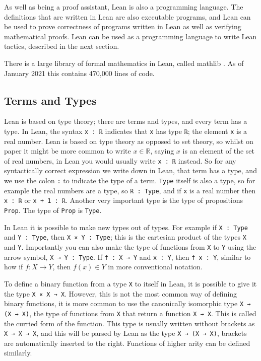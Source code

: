 \documentclass[12pt]{article} %
\theoremstyle{definition}
\theoremstyle{definition}
\theoremstyle{definition}
\theoremstyle{definition}
\begin{document}
As well as being a proof assistant, Lean is also a programming language. The definitions
that are written in Lean are also executable programs, and Lean can be used to prove correctness
of programs written in Lean as well as verifying mathematical proofs. Lean can
be used as a programming language to write Lean tactics, described in the next section.

There is a large library of formal mathematics in Lean, called mathlib
\cite{ThemathlibCommunity2020}. As of January 2021 this contains 470,000 lines of code.

\subsection{Terms and Types}

Lean is based on type theory; there are terms and types, and every term has a type.
In Lean, the syntax \lstinline{x : ℝ} indicates that \lstinline{x} has type \lstinline{ℝ};
the element \lstinline{x} is a real number.
Lean is based on type theory as opposed to set theory, so whilst on paper it might
be more common to write $x \in \mathbb{R}$, saying $x$ is an element of the set of real numbers, in Lean
you would usually write \lstinline{x : ℝ} instead.
So for any syntactically correct expression we write down in Lean, that term has a type,
and we use the colon \lstinline{:} to indicate the type of a term.
\lstinline{Type} itself is also a type, so for example the real numbers are a type,
so \lstinline{ℝ : Type},
and if \lstinline{x} is a real number then \lstinline{x : ℝ} or \lstinline{x + 1 : ℝ}.
Another very important type is the type of propositions \lstinline{Prop}.
The type of \lstinline{Prop} is \lstinline{Type}.

In Lean it is possible to make new types out of types. For example if \lstinline{X : Type}
and \lstinline{Y : Type}, then \lstinline{X × Y : Type}; this is the cartesian
product of the types \lstinline{X} and \lstinline{Y}. Importantly you can also make the type
of functions from \lstinline{X} to \lstinline{Y} using the arrow symbol,
\lstinline{X → Y : Type}. If \lstinline{f : X → Y} and \lstinline{x : Y}, then
\lstinline{f x : Y}, similar to how if $f : X \to Y$, then $f(x) \in Y$
in more conventional notation.

To define a binary function from a type \lstinline{X} to itself in Lean,
it is possible to give it the type \lstinline{X × X → X}. However, this is not
the most common way of defining binary functions, it is more common to use the
canonically isomorphic type \lstinline{X → (X → X)}, the type of functions
from \lstinline{X} that return a function \lstinline{X → X}.
This is called the curried form of the function. This type is usually written without
brackets as \lstinline{X → X → X}, and this will be parsed by Lean as the type
\lstinline{X → (X → X)}, brackets are automatically inserted to the right.
Functions of higher arity can be defined similarly.
\end{document}
